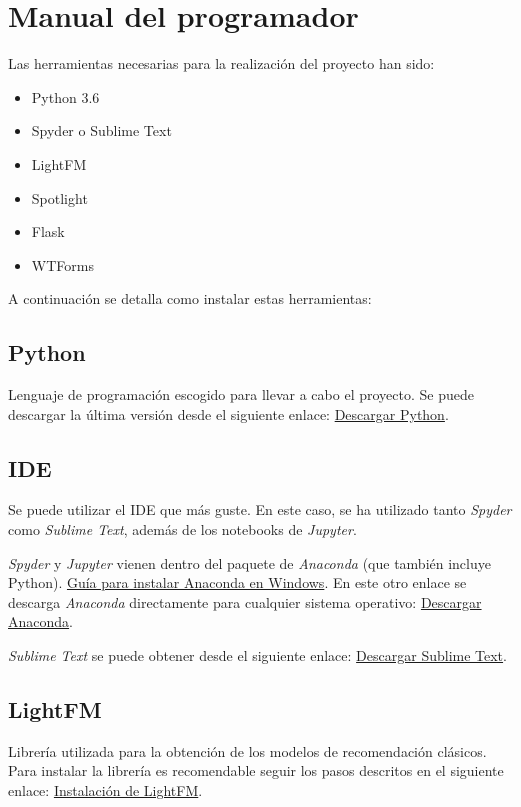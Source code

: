 \section{Manual del programador}
Las herramientas necesarias para la realización del proyecto han sido:
\begin{itemize}
\tightlist
\item Python 3.6
\item Spyder o Sublime Text
\item LightFM
\item Spotlight
\item Flask
\item WTForms
\end{itemize}
A continuación se detalla como instalar estas herramientas:

\subsection{Python}
Lenguaje de programación escogido para llevar a cabo el proyecto. Se puede descargar la última versión desde el siguiente enlace: \href{https://www.python.org/downloads/}{Descargar Python}.

\subsection{IDE}
Se puede utilizar el IDE que más guste. En este caso, se ha utilizado tanto \textit{Spyder} como \textit{Sublime Text}, además de los notebooks de \textit{Jupyter}.

\textit{Spyder} y \textit{Jupyter} vienen dentro del paquete de \textit{Anaconda} (que también incluye Python). \href{https://www.datacamp.com/community/tutorials/installing-anaconda-windows}{Guía para instalar Anaconda en Windows}. En este otro enlace se descarga \textit{Anaconda} directamente para cualquier sistema operativo: \href{https://www.anaconda.com/distribution/}{Descargar Anaconda}.

\textit{Sublime Text} se puede obtener desde el siguiente enlace: \href{https://www.sublimetext.com/3}{Descargar Sublime Text}.

\subsection{LightFM}
Librería utilizada para la obtención de los modelos de recomendación clásicos. Para instalar la librería es recomendable seguir los pasos descritos en el siguiente enlace: \href{http://lyst.github.io/lightfm/docs/home.html#installation}{Instalación de LightFM}.

